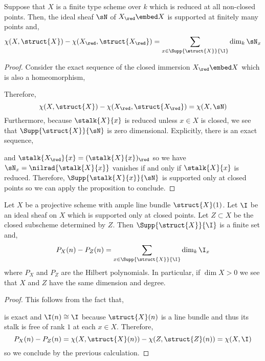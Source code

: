 \documentclass[12pt]{article}
\begin{document}
\begin{cor}
Suppose that $X$ is a finite type scheme over $k$ which is reduced at all non-closed points. Then, the ideal sheaf $\sN$ of $X_{\red} \embed X$ is supported at finitely many points and,
\[ \chi(X, \struct{X}) - \chi(X_{\red}, \struct{X_{\red}}) = \sum_{x \in \Supp{\struct{X}}{\I}} \dim_k \sN_x \]
\end{cor}

\begin{proof}
Consider the exact sequence of the closed immersion $X_{\red} \embed X$ which is also a homeomorphism,
\begin{center}
\end{center}
Therefore,
\[ \chi(X, \struct{X}) - \chi(X_{\red}, \struct{X_{\red}}) = \chi(X, \sN) \]
Furthermore, because $\stalk{X}{x}$ is reduced unless $x \in X$ is closed, we see that $\Supp{\struct{X}}{\sN}$ is zero dimensional. Explicitly, there is an exact sequence,
\begin{center}
\end{center} 
and $\stalk{X_{\red}}{x} = (\stalk{X}{x})_{\red}$ so we have $\sN_x = \nilrad{\stalk{X}{x}}$  vanishes if and only if $\stalk{X}{x}$ is reduced. Therefore, $\Supp{\stalk{X}{x}}{\sN}$ is supported only at closed points so we can apply the proposition to conclude.
\end{proof}

\begin{cor}
Let $X$ be a projective scheme with ample line bundle $\struct{X}(1)$.  Let $\I$ be an ideal sheaf on $X$ which is supported only at closed points. Let $Z \subset X$ be the closed subscheme determined by $Z$. Then $\Supp{\struct{X}}{\I}$ is a finite set and,
\[ P_X(n) - P_Z(n) = \sum_{x \in \Supp{\struct{X}}{\I}} \dim_{k}{\I_x} \]
where $P_X$ and $P_Z$ are the Hilbert polynomials. In particular, if $\dim{X} > 0$ we see that $X$ and $Z$ have the same dimension and degree.
\end{cor}

\begin{proof}
This follows from the fact that,
\begin{center}
\end{center}
is exact and $\I(n) \cong \I$ because $\struct{X}(n)$ is a line bundle and thus its stalk is free of rank $1$ at each $x \in X$. Therefore, 
\[ P_X(n) - P_Z(n) = \chi(X, \struct{X}(n)) - \chi(Z, \struct{Z}(n)) = \chi(X, \I) \]
so we conclude by the previous calculation. 
\end{proof}
\end{document}
